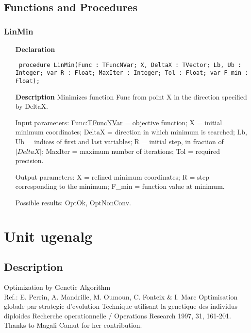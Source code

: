 \documentclass[12pt,a4paper,oneside]{report}
\newcommand{\declarationitem}[1]{\textbf{#1}}
\newcommand{\descriptiontitle}[1]{\textbf{#1}}
\newcommand{\code}[1]{\texttt{#1}}
\begin{document}
\subsection{Functions and Procedures}
\subsubsection{LinMin}
\label{ulinmin-LinMin}
\begin{itemize}\item[\declarationitem{Declaration}\hfill]
	\begin{flushleft}
		\code{
			procedure LinMin(Func : TFuncNVar; X, DeltaX : TVector; Lb, Ub : Integer; var R : Float; MaxIter : Integer; Tol : Float; var F{\_}min : Float);}
		
	\end{flushleft}
	
	\par
	\item[\descriptiontitle{Description}]
	Minimizes function Func from point X in the direction specified by DeltaX.
	
	Input parameters: Func:\hyperref[utypes-TFuncNVar]{TFuncNVar} = objective function; X = initial minimum coordinates; DeltaX = direction in which minimum is searched; Lb, Ub = indices of first and last variables; R = initial step, in fraction of $|DeltaX|$; MaxIter = maximum number of iterations; Tol = required precision.
	
	Output parameters: X = refined minimum coordinates; R = step corresponding to the minimum; F{\_}min = function value at minimum.
	
	Possible results: OptOk, OptNonConv.
	
\end{itemize}

\section{Unit ugenalg}
\label{ugenalg}
\subsection{Description}
Optimization by Genetic Algorithm\\ 
Ref.: E. Perrin, A. Mandrille, M. Oumoun, C. Fonteix {\&} I. Marc Optimisation globale par strategie d'evolution Technique utilisant la genetique des individus diploides Recherche operationnelle / Operations Research 1997, 31, 161{-}201.\\
Thanks to Magali Camut for her contribution.
\end{document}

